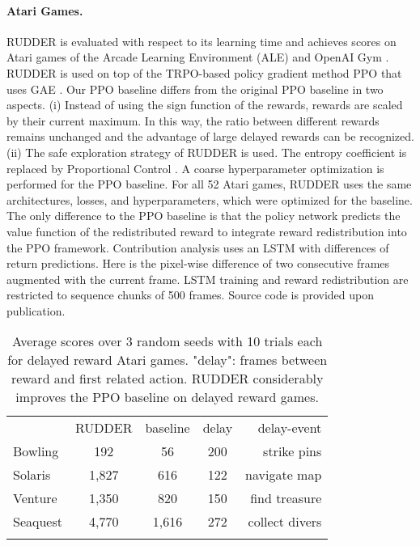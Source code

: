 \documentclass{article}
\begin{document}
\paragraph{Atari Games.}\label{para:Atari}
\label{c:Atari}
RUDDER is evaluated with respect to its learning time and 
achieves scores on Atari games of the
Arcade Learning Environment (ALE) \cite{Bellemare:13}
and OpenAI Gym \cite{Brockman:16}.
RUDDER is used on top of the TRPO-based \cite{Schulman:15icml} 
policy gradient method PPO that uses GAE \cite{Schulman:15}.
Our PPO baseline differs from the original 
PPO baseline \cite{Schulman:17} in two aspects.
(i) Instead of using the sign function of the rewards, 
rewards are scaled by their current maximum.
In this way, the ratio between different rewards
remains unchanged and the advantage of large delayed rewards
can be recognized. 
(ii) The safe exploration strategy of RUDDER is used.
The entropy coefficient is replaced by 
Proportional Control \cite{Bolton:15,Berthelot:17}. 
A coarse hyperparameter optimization is performed for the PPO baseline.
For all 52 Atari games, RUDDER uses 
the same architectures, losses, and hyperparameters, 
which were optimized for the baseline.
The only difference to the PPO baseline is that
the policy network predicts the value function 
of the redistributed reward to integrate reward redistribution
 into the PPO framework.
Contribution analysis uses an LSTM with
differences of return predictions.
Here  is the pixel-wise
difference of two consecutive frames augmented 
with the current frame.
LSTM training and reward redistribution are restricted to
sequence chunks of 500 frames.
Source code is provided upon publication.










\begin{table}
\begin{center}
\begin{tabular}{lcccr}
\toprule
& RUDDER & baseline & delay & delay-event\\
Bowling  & 192 & 56 & 200 & strike pins\\
Solaris  & 1,827 & 616 & 122 & navigate map\\
Venture  & 1,350 & 820 & 150 & find treasure\\
Seaquest  & 4,770 & 1,616 & 272 & collect divers\\
\bottomrule
\\ 
\end{tabular}
\caption{Average scores over 3 random seeds with 10 trials each for 
delayed reward Atari games.
"delay": frames between reward and first related action.  
RUDDER considerably improves the PPO baseline on delayed reward games.\label{tab:atarires}}\end{center}
\end{table}
\end{document}
